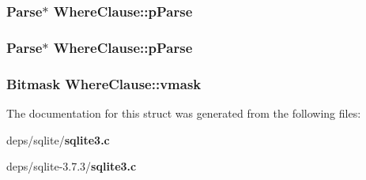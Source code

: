 \subsubsection{\setlength{\rightskip}{0pt plus 5cm}\bf{Parse}$\ast$ \bf{Where\-Clause::p\-Parse}}\label{structWhereClause_c59f20149404665239b171bdd4500945}


\subsubsection{\setlength{\rightskip}{0pt plus 5cm}\bf{Parse}$\ast$ \bf{Where\-Clause::p\-Parse}}\label{structWhereClause_c59f20149404665239b171bdd4500945}


\subsubsection{\setlength{\rightskip}{0pt plus 5cm}\bf{Bitmask} \bf{Where\-Clause::vmask}}\label{structWhereClause_6b87c9909a388c76ed5b4b21f73453f9}




The documentation for this struct was generated from the following files:\begin{CompactItemize}
\item 
deps/sqlite/\bf{sqlite3.c}\item 
deps/sqlite-3.7.3/\bf{sqlite3.c}\end{CompactItemize}
